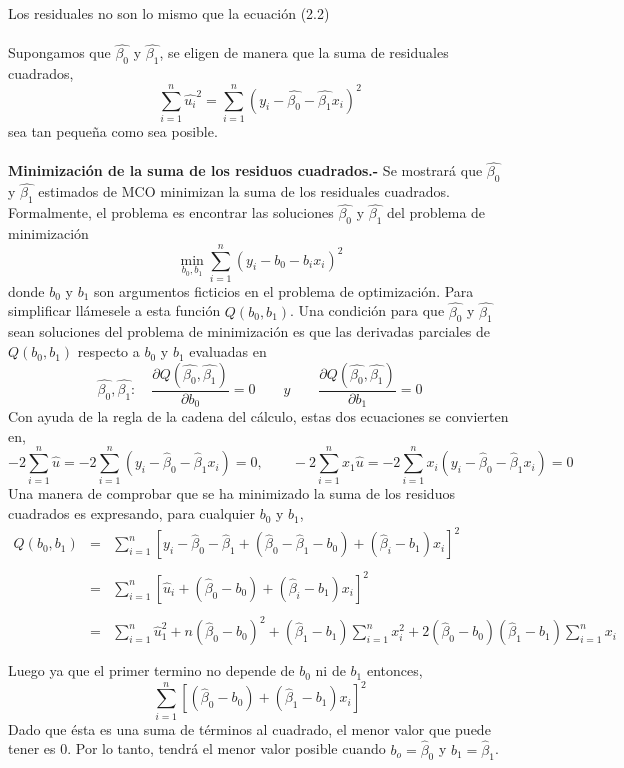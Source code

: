 Los residuales no son lo mismo que la ecuación (2.2)\\\\
Supongamos que $\hat{\beta_0}$ y $\hat{\beta_1}$, se eligen de manera que la suma de residuales cuadrados, 
\begin{equation}
    \sum\limits_{i=1}^n \hat{u_i}^2 = \sum\limits_{i=1}^n (y_i - \hat{\beta_0} - \hat{\beta_1}x_i)^2
\end{equation}
sea tan pequeña como sea posible. \\\\

\textbf{Minimización de la suma de los residuos cuadrados.-}
Se mostrará que $\hat{\beta_0}$ y $\hat{\beta_1}$ estimados de MCO minimizan la suma de los residuales cuadrados. Formalmente, el problema es encontrar las soluciones $\hat{\beta_0}$ y $\hat{\beta_1}$ del problema de minimización 
$$\min_{b_0,b_1} \sum_{i=1}^n (y_i-b_0-b_ix_i)^2$$
donde $b_0$ y $b_1$ son argumentos ficticios en el problema de optimización. Para simplificar llámesele a esta función $Q(b_0,b_1)$. Una condición para que $\hat{\beta_0}$ y $\hat{\beta_1}$ sean soluciones del problema de minimización es que las derivadas parciales de $Q(b_0,b_1)$ respecto a $b_0$ y $b_1$ evaluadas en $$\hat{\beta_0},\hat{\beta_1}: \quad \dfrac{\partial Q(\hat{\beta_0},\hat{\beta_1})}{\partial b_0}=0 \qquad y \qquad \dfrac{\partial Q(\hat{\beta_0},\hat{\beta_1})}{\partial b_1}=0$$
Con ayuda de la regla de la cadena del cálculo, estas dos ecuaciones se convierten en,
$$-2\sum_{i=1}^n \hat{u} = -2\sum_{i=1}^n(y_i-\hat{\beta}_0 - \hat{\beta}_1 x_i)=0, \qquad -2\sum_{i=1}^n x_1\hat{u} = -2\sum_{i=1}^n x_i(y_i-\hat{\beta}_0 - \hat{\beta}_1 x_i)=0$$
Una manera de comprobar que se ha minimizado la suma de los residuos cuadrados es expresando, para cualquier $b_0$ y $b_1$,
$$\begin{array}{rcl}
    Q(b_0,b_1)&=&\sum\limits_{i=1}^n \left[y_i-\hat{\beta}_0 - \hat{\beta}_1 + (\hat{\beta}_0 - \hat{\beta}_1 - b_0) + (\hat{\beta}_i - b_1)x_i\right]^2\\\\
	      &=&\sum\limits_{i=1}^n \left[\hat{u}_i + (\hat{\beta}_0 - b_0) + (\hat{\beta}_i - b_1)x_i\right]^2\\\\
	      &=&\sum\limits_{i=1}^n \hat{u}_1^2 + n(\hat{\beta}_0-b_0)^2 + (\hat{\beta}_1-b_1)\sum\limits_{i=1}^n x_i^2 + 2(\hat{\beta}_0-b_0)(\hat{\beta}_1-b_1)\sum\limits_{i=1}^n x_i\\\\
\end{array}$$
Luego ya que el primer termino no depende de $b_0$ ni de $b_1$ entonces,
$$\sum_{i=1}^n \left[(\hat{\beta}_0-b_0)+(\hat{\beta}_1-b_1)x_i\right]^2$$
Dado que ésta es una suma de términos al cuadrado, el menor valor que puede tener es 0. Por lo tanto, tendrá el menor valor posible cuando $b_o=\hat{\beta}_0$ y $b_1=\hat{\beta}_1$.\\\\

